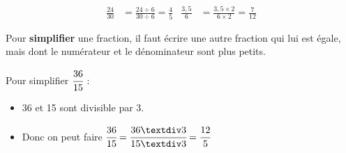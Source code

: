 \documentclass[a4paper,11pt]{article}
\begin{document}
\begin{exemple}
	\begin{align*}
		\frac{24}{30} & = \frac{24 ÷ 6}{30 ÷ 6} = \frac{4}{5}   &
		\frac{3,5}{6} & = \frac{3,5 × 2}{6 × 2} = \frac{7}{12}
	\end{align*}
\end{exemple}

\begin{cours}
	Pour \textbf{simplifier} une fraction, il faut écrire une autre fraction qui lui est égale, mais dont le numérateur et le dénominateur sont plus petits.
\end{cours}

\begin{exemple}
	Pour simplifier $\cfrac{36}{15}$ :
	\begin{itemize}
		\item 36 et 15 sont divisible par 3.
		\item Donc on peut faire $\cfrac{36}{15} = \cfrac{36 ÷ 3}{15 ÷ 3} = \cfrac{12}{5}$
	\end{itemize}
\end{exemple}
\end{document}

